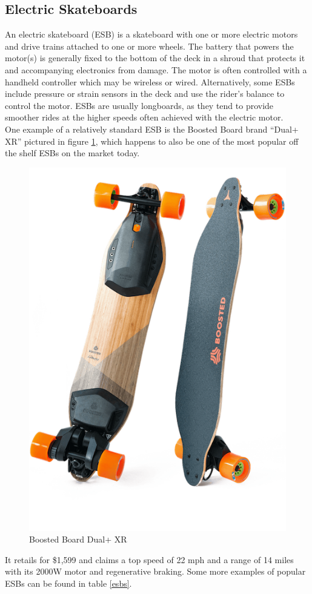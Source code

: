 \documentclass[letterpaper,12pt]{article}
\begin{document}
\subsection{Electric Skateboards}
An electric skateboard (ESB) is a skateboard with one or more electric motors and drive trains attached to one or more wheels. The battery that powers the motor(s) is generally fixed to the bottom of the deck in a shroud that protects it and accompanying electronics from damage. The motor is often controlled with a handheld controller which may be wireless or wired. Alternatively, some ESBs include pressure or strain sensors in the deck and use the rider's balance to control the motor. ESBs are usually longboards, as they tend to provide smoother rides at the higher speeds often achieved with the electric motor.\\
One example of a relatively standard ESB is the Boosted Board brand “Dual+ XR” pictured in figure \ref{boosted}, which happens to also be one of the most popular off the shelf ESBs on the market today.
\begin{figure}[!htbp]\centering
\includegraphics[width=.3\textwidth]{boosted.png}
\caption{Boosted Board Dual+ XR}
\label{boosted}
\end{figure}
It retails for \$1,599 and claims a top speed of 22 mph and a range of 14 miles with its 2000W motor and regenerative braking. Some more examples of popular ESBs can be found in table \ref{esbs}.
\begin{table}[!htbp]
\caption{Popular ESBs on the Market}
\label{esbs}
\end{table}
\end{document}
